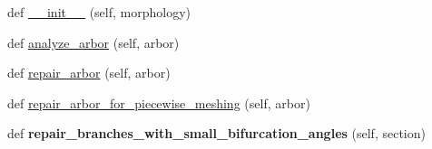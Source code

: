 \begin{DoxyCompactItemize}
\item 
def \hyperlink{classmeshy_1_1neuromorphovis_1_1morphologies_1_1morphology__analyzer_1_1MorphologyAnalyzer_a4c8907d64a2799dd3dbfea72683ec809}{\+\_\+\+\_\+init\+\_\+\+\_\+} (self, morphology)
\item 
def \hyperlink{classmeshy_1_1neuromorphovis_1_1morphologies_1_1morphology__analyzer_1_1MorphologyAnalyzer_a17d8868803fde11694d16d6ac5f84ffb}{analyze\+\_\+arbor} (self, arbor)
\item 
def \hyperlink{classmeshy_1_1neuromorphovis_1_1morphologies_1_1morphology__analyzer_1_1MorphologyAnalyzer_a3bc5970d2093222b349535a5d79f0c64}{repair\+\_\+arbor} (self, arbor)
\item 
def \hyperlink{classmeshy_1_1neuromorphovis_1_1morphologies_1_1morphology__analyzer_1_1MorphologyAnalyzer_a665e56099fd2f0363e4f077d2bd94c2b}{repair\+\_\+arbor\+\_\+for\+\_\+piecewise\+\_\+meshing} (self, arbor)
\item 
def {\bfseries repair\+\_\+branches\+\_\+with\+\_\+small\+\_\+bifurcation\+\_\+angles} (self, section)\hypertarget{classmeshy_1_1neuromorphovis_1_1morphologies_1_1morphology__analyzer_1_1MorphologyAnalyzer_a18be36e6a9f480761c79849a299c512b}{}\label{classmeshy_1_1neuromorphovis_1_1morphologies_1_1morphology__analyzer_1_1MorphologyAnalyzer_a18be36e6a9f480761c79849a299c512b}


\end{DoxyCompactItemize}
